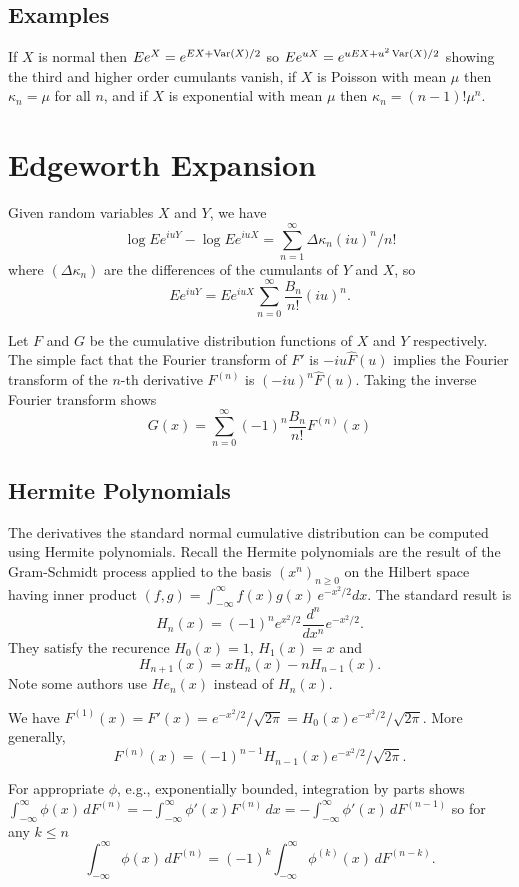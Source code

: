 \documentclass[11pt]{article}
\newcommand{\Var}{\mathop{\rm{Var}}}
\begin{document}
\subsection{Examples}
If \(X\) is
normal then \(Ee^X = e^{E X + \Var(X)/2}\) so
\(Ee^{uX} = e^{uEX + u^2\Var(X)/2}\) showing the
third and higher order cumulants vanish, if \(X\) is Poisson
with mean \(\mu\) then \(\kappa_n = \mu\) for all \(n\), and
if \(X\) is exponential with mean \(\mu\) then
\(\kappa_n = (n - 1)!\mu^n\).

\section{Edgeworth Expansion}
Given random
variables \(X\) and \(Y\), we have
\[\log E e^{iuY} - \log E e^{iuX} = \sum_{n=1}^\infty \Delta\kappa_n (iu)^n/n!\]
where \((\Delta\kappa_n)\) are the differences of the cumulants 
of \(Y\) and \(X\), so
\[
Ee^{iuY} = Ee^{iuX}\sum_{n=0}^\infty \frac{B_n}{n!}(iu)^n.
\]

Let \(F\) and \(G\) be the cumulative distribution functions of
\(X\) and \(Y\) respectively.
The simple fact that the Fourier transform of \(F'\) is \(-iu \hat F(u)\) 
implies the Fourier transform of the \(n\)-th derivative
\(F^{(n)}\) is \((-iu)^n\hat F(u)\).
Taking the inverse Fourier transform shows
\[
G(x) = \sum_{n=0}^\infty (-1)^n \frac{B_n}{n!} F^{(n)}(x)
\]

\subsection{Hermite Polynomials}
The derivatives the standard normal cumulative distribution 
can be computed using Hermite polynomials\cite{?}.
Recall the Hermite polynomials are the result of the Gram-Schmidt
process applied to the basis \((x^n)_{n\ge0}\) on the Hilbert space
having inner product \((f,g) = \int_{-\infty}^\infty f(x)g(x)\,e^{-x^2/2}dx\).
The standard result is
\[
H_n(x) = (-1)^n e^{x^2/2}\frac{d^n}{dx^n}e^{-x^2/2}.
\]
They satisfy the recurence \(H_0(x) = 1\), \(H_1(x) = x\) and
\[
H_{n+1}(x) = xH_n(x) - n H_{n-1}(x).
\]
Note some authors use \(He_n(x)\) instead of \(H_n(x)\).

We have
\(
F^{(1)}(x) = F'(x) = e^{-x^2/2}/\sqrt{2\pi} 
= H_0(x) e^{-x^2/2}/\sqrt{2\pi}.
\)
More generally, 
\[
F^{(n)}(x) = (-1)^{n-1} H_{n-1}(x) e^{-x^2/2}/\sqrt{2\pi}.
\]

For appropriate \(\phi\), e.g., exponentially bounded, 
integration by parts shows 
\(\int_{-\infty}^\infty \phi(x)\,dF^{(n)}
= - \int_{-\infty}^\infty \phi'(x)F^{(n)}\,dx
= - \int_{-\infty}^\infty \phi'(x)\,dF^{(n-1)}\)
so for any \(k\le n\)
\[
\int_{-\infty}^\infty \phi(x)\,dF^{(n)}
= (-1)^k \int_{-\infty}^\infty \phi^{(k)}(x)\,dF^{(n-k)}.
\]
\end{document}
